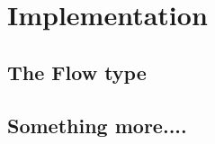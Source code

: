 \section{Implementation}
\label{chapter:implementation}
\subsection{The Flow type}
\label{sec:flow}

\subsection{Something more....}
